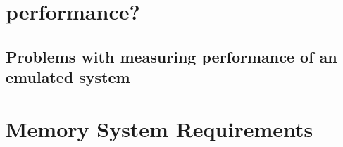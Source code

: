 \section{performance?}
\subsection{Problems with measuring performance of an emulated system}

\section{Memory System Requirements}
\cite{jacobSoftwaremanagedAddressTranslation1997}


